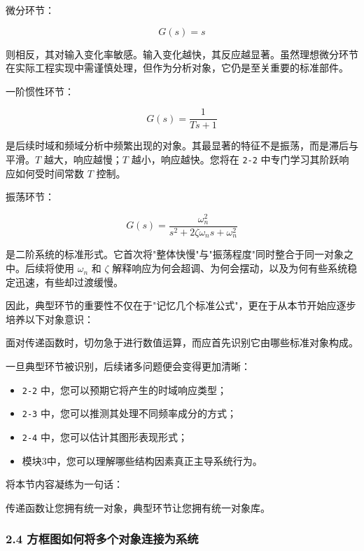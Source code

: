 \documentclass[
  11pt]{article}
\providecommand{\tightlist}{%
  \setlength{\itemsep}{0pt}\setlength{\parskip}{0pt}}
\renewenvironment{quote}
  {\begin{HandoutQuoteBox}\small\color{TitleBlue}\noindent\ignorespaces}
  {\end{HandoutQuoteBox}}
\begin{document}
微分环节：

\[
G(s)=s
\]

则相反，其对输入变化率敏感。输入变化越快，其反应越显著。虽然理想微分环节在实际工程实现中需谨慎处理，但作为分析对象，它仍是至关重要的标准部件。

一阶惯性环节：

\[
G(s)=\frac{1}{Ts+1}
\]

是后续时域和频域分析中频繁出现的对象。其最显著的特征不是振荡，而是滞后与平滑。\(T\)
越大，响应越慢；\(T\) 越小，响应越快。您将在 \texttt{2-2}
中专门学习其阶跃响应如何受时间常数 \(T\) 控制。

振荡环节：

\[
G(s)=\frac{\omega_n^2}{s^2+2\zeta\omega_n s+\omega_n^2}
\]

是二阶系统的标准形式。它首次将"整体快慢"与"振荡程度"同时整合于同一对象之中。后续将使用
\(\omega_n\) 和 \(\zeta\)
解释响应为何会超调、为何会摆动，以及为何有些系统稳定迅速，有些却过渡缓慢。

因此，典型环节的重要性不仅在于"记忆几个标准公式"，更在于从本节开始应逐步培养以下对象意识：

\begin{quote}
面对传递函数时，切勿急于进行数值运算，而应首先识别它由哪些标准对象构成。
\end{quote}

一旦典型环节被识别，后续诸多问题便会变得更加清晰：

\begin{itemize}
\tightlist
\item
  \texttt{2-2} 中，您可以预期它将产生的时域响应类型；
\item
  \texttt{2-3} 中，您可以推测其处理不同频率成分的方式；
\item
  \texttt{2-4} 中，您可以估计其图形表现形式；
\item
  模块3中，您可以理解哪些结构因素真正主导系统行为。
\end{itemize}

将本节内容凝练为一句话：

\begin{quote}
传递函数让您拥有统一对象，典型环节让您拥有统一对象库。
\end{quote}

\subsubsection{2.4
方框图如何将多个对象连接为系统}\label{ux65b9ux6846ux56feux5982ux4f55ux5c06ux591aux4e2aux5bf9ux8c61ux8fdeux63a5ux4e3aux7cfbux7edf}
\end{document}
